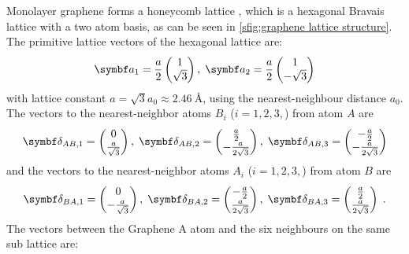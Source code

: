 \documentclass[../notes.tex]{subfiles}
\begin{document}
Monolayer graphene forms a honeycomb lattice \cite{yangStructureGrapheneIts2018}, which is a hexagonal Bravais lattice with a two atom basis, as can be seen in \cref{sfig:graphene lattice structure}.
The primitive lattice vectors of the hexagonal lattice are:
\begin{align}
	\vb{a}_1 = \frac{a}{2} \begin{pmatrix} 1 \\ \sqrt{3} \end{pmatrix}, \; \vb{a}_2 = \frac{a}{2} \begin{pmatrix} 1 \\ -\sqrt{3} \end{pmatrix}
\end{align}
with lattice constant \(a = \sqrt{3} a_0 \approx \SI{2.46}{\angstrom}\), using the nearest-neighbour distance \(a_0\).
The vectors to the nearest-neighbor atoms \(B_i\) (\(i = 1, 2, 3,\)) from atom \(A\) are 
\begin{align}
	\vb{\delta}_{AB, 1} = \begin{pmatrix} 0 \\ \frac{a}{\sqrt{3}} \end{pmatrix},\; \vb{\delta}_{AB, 2} = \begin{pmatrix} \frac{a}{2} \\ -\frac{a}{2\sqrt{3}} \end{pmatrix},\; \vb{\delta}_{AB, 3} = \begin{pmatrix} -\frac{a}{2} \\ -\frac{a}{2\sqrt{3}} \end{pmatrix}
\end{align}
and the vectors to the nearest-neighbor atoms \(A_i\) (\(i = 1, 2, 3,\)) from atom \(B\) are
\begin{align}
	\vb{\delta}_{BA, 1} = \begin{pmatrix} 0 \\ -\frac{a}{\sqrt{3}} \end{pmatrix},\; \vb{\delta}_{BA, 2} = \begin{pmatrix} -\frac{a}{2} \\ \frac{a}{2\sqrt{3}} \end{pmatrix},\; \vb{\delta}_{BA, 3} = \begin{pmatrix} \frac{a}{2} \\ \frac{a}{2\sqrt{3}} \end{pmatrix} \;.
\end{align}
The vectors between the Graphene \(\mathrm{A}\) atom and the six neighbours on the same sub lattice are:
\end{document}
